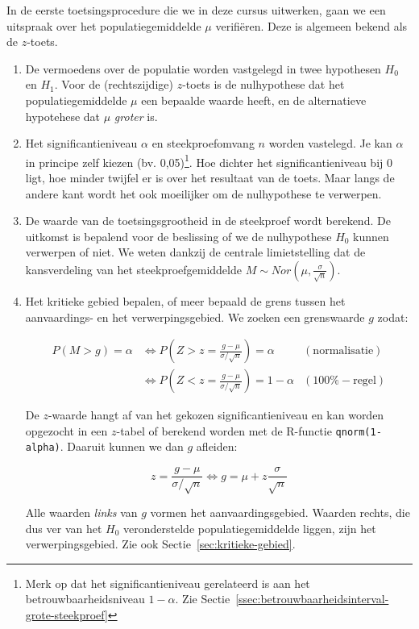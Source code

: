 In de eerste toetsingsprocedure die we in deze cursus uitwerken, gaan we een uitspraak over het populatiegemiddelde $\mu$ verifiëren. Deze is algemeen bekend als de $z$-toets.

\begin{enumerate}
  \item De vermoedens over de populatie worden vastgelegd in twee hypothesen $H_{0}$ en $H_{1}$. Voor de (rechtszijdige) $z$-toets is de nulhypothese dat het populatiegemiddelde $\mu$ een bepaalde waarde heeft, en de alternatieve hypotehese dat $\mu$ \emph{groter} is.
  \item Het significantieniveau $\alpha$ en steekproefomvang $n$ worden vastelegd. Je kan $\alpha$ in principe zelf kiezen (bv. 0,05)\footnote{Merk op dat het significantieniveau gerelateerd is aan het betrouwbaarheidsniveau $1-\alpha$. Zie Sectie~\ref{ssec:betrouwbaarheidsinterval-grote-steekproef}}. Hoe dichter het significantieniveau bij 0 ligt, hoe minder twijfel er is over het resultaat van de toets. Maar langs de andere kant wordt het ook moeilijker om de nulhypothese te verwerpen.
  \item De waarde van de toetsingsgrootheid in de steekproef wordt berekend. De uitkomst is bepalend voor de beslissing of we de nulhypothese $H_{0}$ kunnen verwerpen of niet. We weten dankzij de centrale limietstelling dat de kansverdeling van het steekproefgemiddelde $M \sim Nor( \mu, \frac{\sigma}{\sqrt{n}})$.
  \item Het kritieke gebied bepalen, of meer bepaald de grens tussen het aanvaardings- en het verwerpingsgebied. We zoeken een grenswaarde $g$ zodat:
  
  \begin{align}
  P(M > g) = \alpha & \Leftrightarrow P\left(Z> z=\frac{g-\mu}{\sigma/\sqrt{n}}\right) = \alpha & \mathrm{(normalisatie)}\\
  & \Leftrightarrow P\left(Z < z = \frac{g-\mu}{\sigma/\sqrt{n}}\right) = 1-\alpha & \mathrm{(100\%-regel)}
  \end{align}
  
  De $z$-waarde hangt af van het gekozen significantieniveau en kan worden opgezocht in een $z$-tabel of berekend worden met de R-functie \texttt{qnorm(1-alpha)}. Daaruit kunnen we dan $g$ afleiden:
  
  \begin{equation}
  z = \frac{g-\mu}{\sigma/\sqrt{n}} \Leftrightarrow g = \mu + z \frac{\sigma}{\sqrt{n}}
  \label{eq:kritieke-grenswaarde-z-toets}
  \end{equation}

  Alle waarden \emph{links} van $g$ vormen het aanvaardingsgebied. Waarden rechts, die dus ver van het $H_0$ veronderstelde populatiegemiddelde liggen, zijn het verwerpingsgebied. Zie ook Sectie~\ref{sec:kritieke-gebied}.
\end{enumerate}

